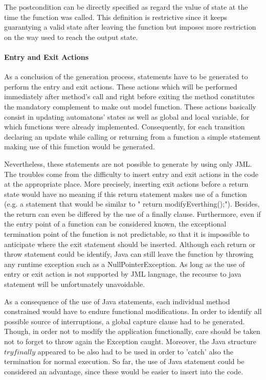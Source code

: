 The postcondition can be directly specified as regard the value of state at the time the function was called. This definition is restrictive since it keeps guarantying a valid state after leaving the function but imposes more restriction on the way used to reach the output state. 

\paragraph{Entry and Exit Actions}
As a conclusion of the generation process, statements have to be generated to perform the entry and exit actions. These actions which will be performed immediately after method's call and right before exiting the method constitutes the mandatory complement to make out model function. These actions basically consist in updating automatons' states as well as global and local variable, for which functions were already implemented. Consequently, for each transition declaring an update while calling or returning from a function a simple statement making use of this function would be generated. 

Nevertheless, these statements are not possible to generate by using only JML. The troubles come from the difficulty to insert entry and exit actions in the code at the appropriate place. More precisely, inserting exit actions before a return state would have no meaning if this return statement makes use of a function (e.g. a statement that would be similar to " return modifyEverthing();"). Besides, the return can even be differed by the use of a finally clause. Furthermore, even if the entry point of a function can be considered known, the exceptional termination point of the function is not predictable, so that it is impossible to anticipate where the exit statement should be inserted. Although each return or throw statement could be identify, Java can still leave the function by throwing any runtime exception such as a NullPointerException. As long as the use of entry or exit action is not supported by JML language, the recourse to java statement will be unfortunately unavoidable.

As a consequence of the use of Java statements, each individual method constrained would have to endure functional modifications. In order to identify all possible source of interruptions, a global capture clause had to be generated. Though, in order not to modify the application functionally, care should be taken not to forget to throw again the Exception caught. Moreover, the Java structure $try{}finally{}$ appeared to be also had to be used in order to 'catch' also the termination for normal execution. So far, the use of Java statement could be considered an advantage, since these would be easier to insert into the code. 

